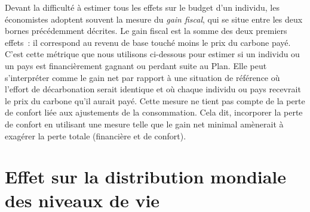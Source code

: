 \documentclass[a5paper,french,openany]{memoir}
\begin{document}
Devant la difficulté à estimer tous les effets sur le budget d'un individu, les économistes adoptent souvent la mesure du \textit{gain fiscal}, qui se situe entre les deux bornes précédemment décrites. Le gain fiscal est la somme des deux premiers effets~: il correspond au revenu de base touché moins le prix du carbone payé. C'est cette métrique que nous utilisons ci-dessous pour estimer si un individu ou un pays est financièrement gagnant ou perdant suite au Plan. Elle peut s'interpréter comme le gain net par rapport à une situation de référence où l'effort de décarbonation serait identique et où chaque individu ou pays recevrait le prix du carbone qu'il aurait payé. Cette mesure ne tient pas compte de la perte de confort liée aux ajustements de la consommation. Cela dit, incorporer la perte de confort en utilisant une mesure %
telle que le gain net minimal amènerait à exagérer la perte totale (financière et de confort).

\section{Effet sur la distribution mondiale des niveaux de vie}\label{app:revenus}
\end{document}
